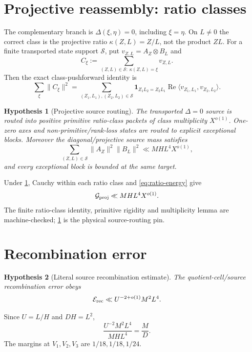\documentclass[11pt]{article}
\newtheorem{hypothesis}[hypothesis]{Hypothesis}
\theoremstyle{definition}
\newcommand{\1}{\mathbf 1}
\begin{document}
\section{Projective reassembly: ratio classes}
\label{sec:projective}
The complementary branch is $\Delta(\xi,\eta)=0$, including $\xi=\eta$.  On $L\ne0$
the correct class is the projective ratio $\kappa(Z,L)=Z/L$, not the product
$ZL$.  For a finite transported state support $\mathcal S$, put
$v_{Z,L}=A_Z\otimes B_L$ and
\[
   C_\xi:=\sum_{(Z,L)\in\mathcal S:\ \kappa(Z,L)=\xi}v_{Z,L}.
\]
Then the exact class-pushforward identity is
\begin{equation}
 \sum_{\xi}\|C_\xi\|^2
 =\sum_{(Z_1,L_1),(Z_2,L_2)\in\mathcal S}
   \1_{Z_1L_2=Z_2L_1}
   \operatorname{Re}\langle v_{Z_1,L_1},v_{Z_2,L_2}\rangle.
 \label{eq:ratio-energy}
\end{equation}

\begin{hypothesis}[Projective source routing]
\label{hyp:projective}
The transported $\Delta=0$ source is routed into positive primitive
ratio-class packets of class multiplicity $X^{o(1)}$.  One-zero axes and
non-primitive/rank-loss states are routed to explicit exceptional blocks.
Moreover the diagonal/projective source mass satisfies
\begin{equation}
   \sum_{(Z,L)\in\mathcal S}\|A_Z\|^2\|B_L\|^2
   \ll MHL^4X^{o(1)},
   \label{eq:projective-source-ceiling}
\end{equation}
and every exceptional block is bounded at the same target.
\end{hypothesis}

Under \cref{hyp:projective}, Cauchy within each ratio class and
\eqref{eq:ratio-energy} give
\[
   \mathcal G_{\rm proj}\ll MHL^4X^{o(1)}.
\]
The finite ratio-class identity, primitive rigidity and multiplicity lemma are
machine-checked; \cref{hyp:projective} is the physical source-routing pin.

\section{Recombination error}
\begin{hypothesis}[Literal source recombination estimate]
\label{hyp:recombination}
The quotient-cell/source recombination error obeys
\begin{equation}
   \mathcal E_{\rm rec}
   \ll U^{-2+o(1)}M^2L^4.
   \label{eq:recombination-error}
\end{equation}
\end{hypothesis}
Since $U=L/H$ and $DH=L^2$,
\[
 \frac{U^{-2}M^2L^4}{MHL^4}=\frac{M}{D}.
\]
The margins at $V_1,V_2,V_3$ are $1/18,1/18,1/24$.
\end{document}
